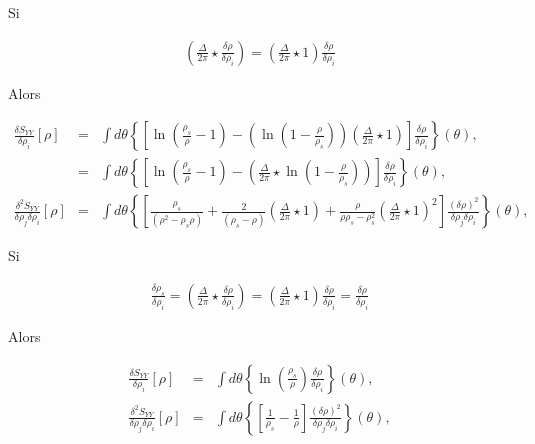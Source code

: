 \begin{aff}
	Si
	
		\begin{eqnarray}
			\left  ( \frac{\Delta}{2\pi} \star \frac{\delta \rho}{\delta \rho_i}  \right ) =  \left  ( \frac{\Delta}{2\pi} \star  1 \right )	\frac{\delta \rho}{\delta \rho_i} 
		\end{eqnarray}
		
		Alors 
		
		\begin{eqnarray}
			\frac{ \delta S_{YY} }{ \delta \rho_i } [\rho ]  & = & \int  d\theta \left \{  \left [ \ln \left ( \frac{ \rho_s}{ \rho} - 1 \right ) -  \left ( \ln \left ( 1 - \frac{ \rho}{ \rho_s}\right ) \right ) \left ( \frac{ \Delta}{2 \pi} \star   1  \right) \right ]  \frac{\delta \rho }{ \delta \rho_i }\right \} ( \theta ) ,\\
			& = & \int  d\theta \left \{  \left [ \ln \left ( \frac{ \rho_s}{ \rho} - 1 \right ) -  \left ( \frac{ \Delta}{2 \pi} \star   \ln \left ( 1 - \frac{ \rho}{ \rho_s}\right )  \right) \right ]  \frac{\delta \rho }{ \delta \rho_i }\right \} ( \theta ), \\
			\frac{ \delta^2 S_{YY} }{ \delta \rho_j\delta \rho_i } [\rho ]  & = &  \int  d\theta\left \{  \left [  \frac{\rho_s}{(\rho^2  - \rho_s\rho)}  +  \frac{2}{( \rho_s - \rho ) } \left (  \frac{\Delta}{2\pi} \star 1    \right )  +  \frac{\rho }{\rho\rho_s - \rho_s^2 }\left (  \frac{\Delta}{2\pi} \star 1 \right )^2  \right ]   \frac{(\delta \rho)^2}{\delta \rho_j \delta \rho_i} \right \}(\theta),
	\end{eqnarray}
	
	Si 
		
		\begin{eqnarray}
			\frac{\delta \rho_s}{\delta \rho_i}  = \left  ( \frac{\Delta}{2\pi} \star \frac{\delta \rho}{\delta \rho_i}  \right ) =  \left  ( \frac{\Delta}{2\pi} \star  1 \right )	\frac{\delta \rho}{\delta \rho_i}  = \frac{\delta \rho}{\delta \rho_i} 	
		\end{eqnarray}
		
		
		Alors 
		
		\begin{eqnarray}
			\frac{ \delta S_{YY} }{ \delta \rho_i } [\rho ]  & = & \int d \theta \left \{ \ln \left ( \frac{ \rho_s}{ \rho}\right )\frac{\delta \rho }{ \delta \rho_i } \right \}( \theta ),\\
			\frac{ \delta^2 S_{YY} }{ \delta \rho_j\delta \rho_i } [\rho ] & = & 	\int  d\theta\left \{  \left [ \frac{1}{\rho_s} - \frac{1}{\rho} \right ]   \frac{(\delta \rho)^2}{\delta \rho_j \delta \rho_i} \right \}(\theta),	
		\end{eqnarray}	
	\end{aff}